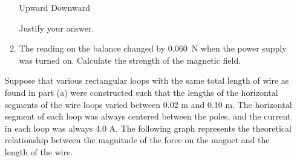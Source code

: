 \documentclass{../../../oss-classkick}
\begin{document}
\begin{enumerate}[leftmargin=15pt]
\begin{enumerate}[resume]
    \vspace{.1in}
    \underline{\hspace{.4in}} Upward\hspace{.5in}
    \underline{\hspace{.4in}} Downward

    Justify your answer.
  \item The reading on the balance changed by \SI{.060}{\newton} when the power
    supply was turned on. Calculate the strength of the magnetic field.
  \end{enumerate}
  \newpage
  Suppose that various rectangular loops with the same total length of wire as
  found in part (a) were constructed such that the lengths of the horizontal
  segments of the wire loops varied between 0.02 m and 0.10 m. The horizontal
  segment of each loop was always centered between the poles, and the current
  in each loop was always 4.0 A. The following graph represents the theoretical
  relationship between the magnitude of the force on the magnet and the length
  of the wire.
  \begin{center}
\end{center}
\end{enumerate}
\end{document}
